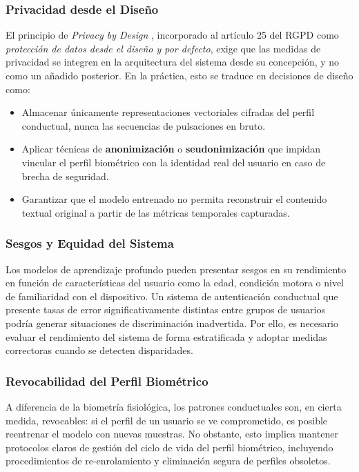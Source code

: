 \subsubsection{Privacidad desde el Diseño}

El principio de \textit{Privacy by Design} \cite{cavoukian2009privacy}, 
incorporado al artículo 25 del RGPD como \textit{protección de datos 
desde el diseño y por defecto}, exige que las medidas de privacidad 
se integren en la arquitectura del sistema desde su concepción, y no 
como un añadido posterior. En la práctica, esto se traduce en decisiones 
de diseño como:

\begin{itemize}
    \item Almacenar únicamente representaciones vectoriales cifradas 
    del perfil conductual, nunca las secuencias de pulsaciones en bruto.
    \item Aplicar técnicas de \textbf{anonimización} o 
    \textbf{seudonimización} que impidan vincular el perfil biométrico 
    con la identidad real del usuario en caso de brecha de seguridad.
    \item Garantizar que el modelo entrenado no permita reconstruir el 
    contenido textual original a partir de las métricas temporales 
    capturadas.
\end{itemize}

\subsubsection{Sesgos y Equidad del Sistema}

Los modelos de aprendizaje profundo pueden presentar sesgos en su 
rendimiento en función de características del usuario como la edad, 
condición motora o nivel de familiaridad con el dispositivo. Un sistema 
de autenticación conductual que presente tasas de error 
significativamente distintas entre grupos de usuarios podría generar 
situaciones de discriminación inadvertida. Por ello, es necesario 
evaluar el rendimiento del sistema de forma estratificada y adoptar 
medidas correctoras cuando se detecten disparidades.

\subsubsection{Revocabilidad del Perfil Biométrico}

A diferencia de la biometría fisiológica, los patrones conductuales 
son, en cierta medida, revocables: si el perfil de un usuario se ve 
comprometido, es posible reentrenar el modelo con nuevas muestras. 
No obstante, esto implica mantener protocolos claros de gestión del 
ciclo de vida del perfil biométrico, incluyendo procedimientos de 
re-enrolamiento y eliminación segura de perfiles obsoletos.